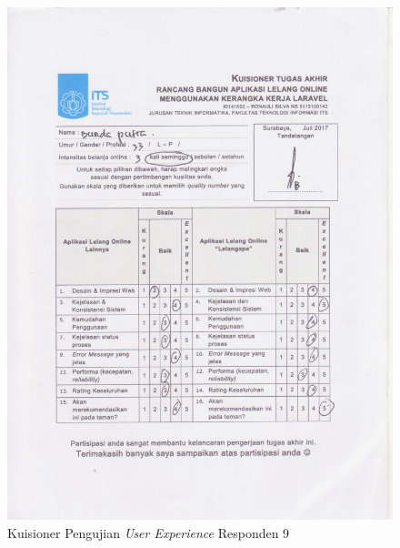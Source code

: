 \begin{figure}[H]
	\centering
	\includegraphics[width=.9\textwidth]{images/bab5/ujipengguna/9.jpg}
	\caption{Kuisioner Pengujian \textit{User Experience} Responden 9}
	\label{quest-9}
\end{figure}

